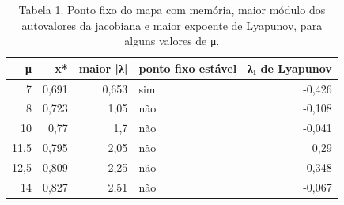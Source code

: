 \begin{table}
\caption{Tabela 1. Ponto fixo do mapa com memória, maior módulo dos autovalores da jacobiana e maior expoente de Lyapunov, para alguns valores de μ.}
\label{tab:01_laboratorio::pontos_fixos}
\begin{tabular}{rrrlr}
\toprule
μ & x* & maior |λ| & ponto fixo estável & λ₁ de Lyapunov \\
\midrule
7 & 0,691 & 0,653 & sim & -0,426 \\
8 & 0,723 & 1,05 & não & -0,108 \\
10 & 0,77 & 1,7 & não & -0,041 \\
11,5 & 0,795 & 2,05 & não & 0,29 \\
12,5 & 0,809 & 2,25 & não & 0,348 \\
14 & 0,827 & 2,51 & não & -0,067 \\
\bottomrule
\end{tabular}
\end{table}
